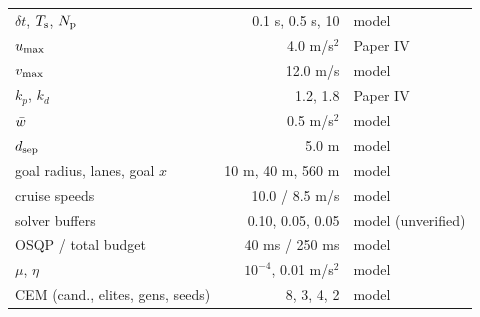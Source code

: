 \begin{table}[h]
\begin{tabular}{@{}lrl@{}}
$\delta t$, $T_{\mathrm{s}}$, $N_{\mathrm{p}}$ & 0.1 s, 0.5 s, 10 & model\\
$u_{\max}$ & 4.0 m/s$^2$ & Paper IV\\
$v_{\max}$ & 12.0 m/s & model\\
$k_p$, $k_d$ & 1.2, 1.8 & Paper IV\\
$\bar w$ & 0.5 m/s$^2$ & model\\
$d_{\mathrm{sep}}$ & 5.0 m & model\\
goal radius, lanes, goal $x$ & 10 m, 40 m, 560 m & model\\
cruise speeds & 10.0 / 8.5 m/s & model\\
solver buffers & 0.10, 0.05, 0.05 & model (unverified)\\
OSQP / total budget & 40 ms / 250 ms & model\\
$\mu$, $\eta$ & $10^{-4}$, 0.01 m/s$^2$ & model\\
CEM (cand., elites, gens, seeds) & 8, 3, 4, 2 & model\\
\bottomrule
\end{tabular}
\end{table}

